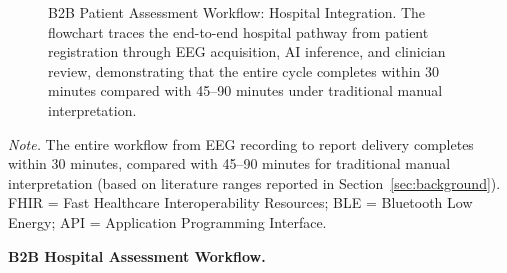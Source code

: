 \begin{figure}[!htbp]
{%
}%
\caption[B2B Patient Assessment Workflow: Hospital Integration]{B2B Patient Assessment Workflow: Hospital Integration. The flowchart traces the end-to-end hospital pathway from patient registration through EEG acquisition, AI inference, and clinician review, demonstrating that the entire cycle completes within 30 minutes compared with 45--90 minutes under traditional manual interpretation.}
\label{fig:b2b_workflow}
\end{figure}

\vspace{0.5em}
\noindent\textit{Note.} The entire workflow from EEG recording to report delivery completes within 30 minutes, compared with 45--90 minutes for traditional manual interpretation (based on literature ranges reported in Section~\ref{sec:background}). FHIR = Fast Healthcare Interoperability Resources; BLE = Bluetooth Low Energy; API = Application Programming Interface.




\noindent\textbf{B2B Hospital Assessment Workflow.}

